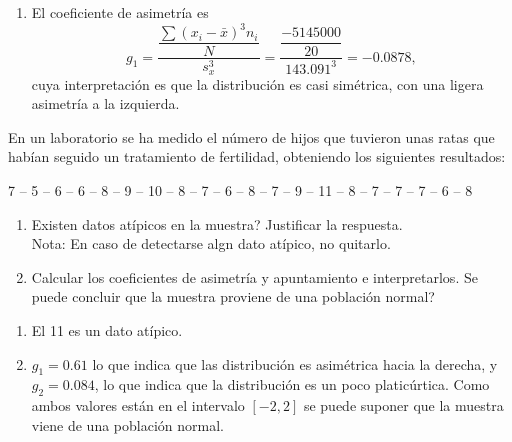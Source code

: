 {\begin{enumerate}
De la misma forma pero procediendo con una frecuencia acumulada $3n/4=15$ para $C_{3}$, lo cual indica que se encuentra en el intervalo
$\left[ 1300,1400\right)$:%
\[
\dfrac{16-11}{1400-1300}=\dfrac{15-11}{C_{3}-1300} \Leftrightarrow C_{3}=1380\text{ kcal}.
\]

Por lo tanto el rango intercuartílico vale $RI=C_{3}-C_{1}=1380-1125=255\text{ kcal,}$
\]
cuya interpretación es que entre 1125 kcal y 1380 kcal se encuentran el 50\% de los individuos de la muestra que comen una cantidad media de
kilocalorías (lejos de los ``excesos'' del 25\% que más kilocalorías toman, o de los ``defectos'' del 25\% que menos kilocalorías
ingieren). Se puede observar, así mismo, que estos datos centrales no están muy dispersos.

\item El coeficiente de asimetría es
\[
g_{1}=\dfrac{\dfrac{\sum \left( x_{i}-\bar x\right) ^{3}n_{i}}{N}}{s_{x}^{3}}=\dfrac{\dfrac{-5145000}{20}}{143.091^{3}}=-0.0878,
\]
cuya interpretación es que la distribución es casi simétrica, con una ligera asimetría a la izquierda.
\end{enumerate}
}


{En un laboratorio se ha medido el número de hijos que tuvieron unas ratas que habían seguido un tratamiento de fertilidad, obteniendo los
siguientes resultados:
\begin{center}
7 -- 5 -- 6 -- 6 -- 8 -- 9 -- 10 -- 8 -- 7 -- 6 -- 8 -- 7 -- 9 -- 11 -- 8 -- 7 -- 7 -- 7 -- 6 -- 8
\end{center}

\begin{enumerate}
\item Existen datos atípicos en la muestra? Justificar la respuesta.\\
Nota: En caso de detectarse algn dato atípico, no quitarlo.
\item Calcular los coeficientes de asimetría y apuntamiento e interpretarlos. Se puede concluir que la muestra proviene de una población
normal?
\end{enumerate}
}
{\begin{enumerate}
\item El 11 es un dato atípico. 
\item $g_1=0.61$ lo que indica que las distribución es asimétrica hacia la derecha, y $g_2=0.084$, lo que indica que la distribución es un
poco platicúrtica. Como ambos valores están en el intervalo $[-2,2]$ se puede suponer que la muestra viene de una población normal. 
\end{enumerate}
}
{}


